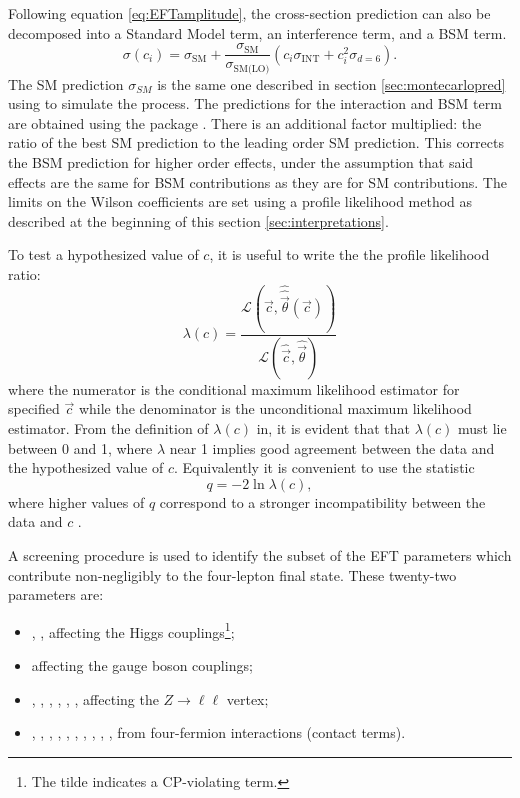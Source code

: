 Following equation \ref{eq:EFTamplitude}, the cross-section prediction can also be decomposed into a Standard Model term, an interference term, and a BSM term. 
\begin{equation} \label{eq:SMEFTXS}
 \sigma(c_i)= \sigma_{\text{SM}} + \frac{\sigma_{\text{SM}}}{\sigma_{\text{SM(LO)}}}(c_i \sigma_{\text{INT}} + c^2_i \sigma_{d=6}).
\end{equation}
The SM prediction $\sigma_{SM}$ is the same one described in section \ref{sec:montecarlopred} using \SHERPA to simulate the \qqFourL process. The predictions for the interaction and BSM term are obtained using the \SMEFTsim {} package \cite{SMEFTsim}. There is an additional factor multiplied: the ratio of the best SM prediction to the leading order SM prediction. This corrects the BSM prediction for higher order effects, under the assumption that said effects are the same for BSM contributions as they are for SM contributions. 
The limits on the Wilson coefficients are set using a profile likelihood method as described at the beginning of this section \ref{sec:interpretations}. 

To test a hypothesized value of $c$, it is useful to write the the profile likelihood ratio:
\begin{equation}
    \lambda(c) = \frac{\mathcal{L}( \vec{c}, \hat{\hat{\vec{\theta}}}(\vec{c})) } {\mathcal{L}(\hat{{\vec{c}}}, \hat{{\vec{\theta}}} )}
\end{equation}
where the numerator is the conditional maximum likelihood estimator for specified $\vec{c}$ while the denominator is the unconditional maximum likelihood estimator. 
From the definition of $\lambda(c)$ in, it is evident that that $\lambda(c)$ must lie between 0 and 1, where $\lambda$ near 1 implies good agreement between the data and the hypothesized value of $c$. Equivalently it is convenient to use the statistic
\begin{equation}\label{eq:lambda_simplified}
    q = - 2 \ln \lambda(c),
\end{equation}
where higher values of $q$ correspond to a stronger incompatibility between the data and $c$ \cite{gcowan}.

A screening procedure is used to identify the subset of the EFT parameters which contribute non-negligibly to the four-lepton final state. These twenty-two parameters are:
\begin{itemize}
  \item \chg, \chgtil, \chdd affecting the Higgs couplings\footnote{The tilde indicates a CP-violating term.};
  \item \chwb affecting the gauge boson couplings;
  \item \chd, \chu, \che, \chlone, \chlthr, \chqone, \chqthr affecting the $Z\to \ell\ell$ vertex;
  \item \ced, \cee, \ceu, \cld, \cle, \cll, \cllone, \clqone, \clqthr, \clu, \cqe from four-fermion interactions (contact terms).
\end{itemize}

